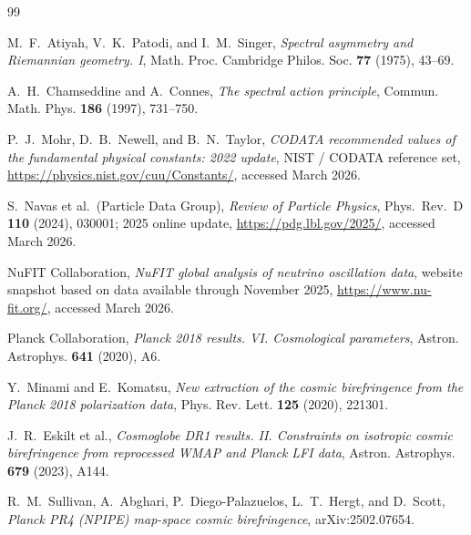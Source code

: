 \documentclass[11pt,a4paper]{article}
\theoremstyle{definition}
\theoremstyle{remark}
\begin{document}
\begin{thebibliography}{99}

M.~F.~Atiyah, V.~K.~Patodi, and I.~M.~Singer,
\newblock \emph{Spectral asymmetry and Riemannian geometry. I},
\newblock Math. Proc. Cambridge Philos. Soc. \textbf{77} (1975), 43--69.

A.~H.~Chamseddine and A.~Connes,
\newblock \emph{The spectral action principle},
\newblock Commun. Math. Phys. \textbf{186} (1997), 731--750.

P.~J.~Mohr, D.~B.~Newell, and B.~N.~Taylor,
\newblock \emph{CODATA recommended values of the fundamental physical constants: 2022 update},
\newblock NIST / CODATA reference set, \url{https://physics.nist.gov/cuu/Constants/}, accessed March 2026.

S.~Navas et al.\ (Particle Data Group),
\newblock \emph{Review of Particle Physics},
\newblock Phys.\ Rev.\ D \textbf{110} (2024), 030001; 2025 online update, \url{https://pdg.lbl.gov/2025/}, accessed March 2026.

NuFIT Collaboration,
\newblock \emph{NuFIT global analysis of neutrino oscillation data},
\newblock website snapshot based on data available through November 2025, \url{https://www.nu-fit.org/}, accessed March 2026.

Planck Collaboration,
\newblock \emph{Planck 2018 results. VI. Cosmological parameters},
\newblock Astron. Astrophys. \textbf{641} (2020), A6.

Y.~Minami and E.~Komatsu,
\newblock \emph{New extraction of the cosmic birefringence from the Planck 2018 polarization data},
\newblock Phys. Rev. Lett. \textbf{125} (2020), 221301.

J.~R.~Eskilt et al.,
\newblock \emph{Cosmoglobe DR1 results. II. Constraints on isotropic cosmic birefringence from reprocessed WMAP and Planck LFI data},
\newblock Astron. Astrophys. \textbf{679} (2023), A144.

R.~M.~Sullivan, A.~Abghari, P.~Diego-Palazuelos, L.~T.~Hergt, and D.~Scott,
\newblock \emph{Planck PR4 (NPIPE) map-space cosmic birefringence},
\newblock arXiv:2502.07654.

\end{thebibliography}
\end{document}
